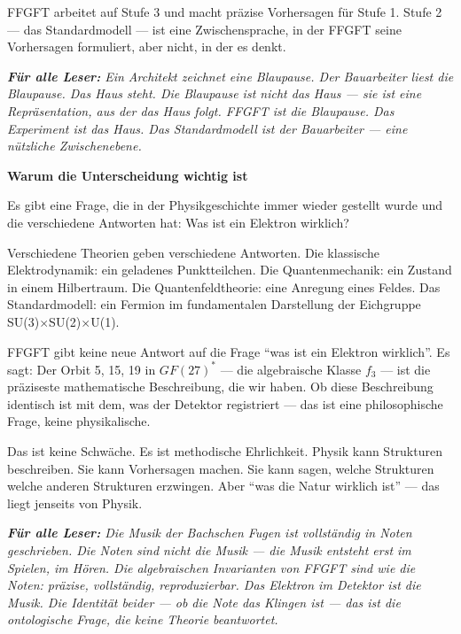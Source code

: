 \documentclass[11pt,oneside]{book}
\newenvironment{laierspur}{%
  \par\vspace{4pt}%
  \noindent\small\itshape\color{blue!60!black}%
  \textbf{Für alle Leser:}\enspace\ignorespaces}{%
  \par\vspace{4pt}\normalsize\normalfont\normalcolor}
\begin{document}
FFGFT arbeitet auf Stufe 3 und macht präzise Vorhersagen für Stufe 1.
Stufe 2 — das Standardmodell — ist eine Zwischensprache, in der FFGFT
seine Vorhersagen formuliert, aber nicht, in der es denkt.


\begin{laierspur}
Ein Architekt zeichnet eine Blaupause. Der Bauarbeiter
liest die Blaupause. Das Haus steht. Die Blaupause ist nicht das Haus —
sie ist eine Repräsentation, aus der das Haus folgt. FFGFT ist die
Blaupause. Das Experiment ist das Haus. Das Standardmodell ist der
Bauarbeiter — eine nützliche Zwischenebene.
\end{laierspur}

\textbf{Warum die Unterscheidung wichtig ist}


Es gibt eine Frage, die in der Physikgeschichte immer wieder gestellt
wurde und die verschiedene Antworten hat: Was ist ein Elektron wirklich?


Verschiedene Theorien geben verschiedene Antworten. Die klassische
Elektrodynamik: ein geladenes Punktteilchen. Die Quantenmechanik:
ein Zustand in einem Hilbertraum. Die Quantenfeldtheorie: eine Anregung
eines Feldes. Das Standardmodell: ein Fermion im fundamentalen
Darstellung der Eichgruppe SU(3)$\times$SU(2)$\times$U(1).


FFGFT gibt keine neue Antwort auf die Frage \enquote{was ist ein Elektron wirklich}.
Es sagt: Der Orbit {5, 15, 19} in $GF(27)^*$ — die algebraische Klasse $f_3$ —
ist die präziseste mathematische Beschreibung, die wir haben. Ob diese
Beschreibung identisch ist mit dem, was der Detektor registriert — das
ist eine philosophische Frage, keine physikalische.


Das ist keine Schwäche. Es ist methodische Ehrlichkeit. Physik kann
Strukturen beschreiben. Sie kann Vorhersagen machen. Sie kann sagen,
welche Strukturen welche anderen Strukturen erzwingen. Aber \enquote{was die
Natur wirklich ist} — das liegt jenseits von Physik.


\begin{laierspur}
Die Musik der Bachschen Fugen ist vollständig in Noten
geschrieben. Die Noten sind nicht die Musik — die Musik entsteht
erst im Spielen, im Hören. Die algebraischen Invarianten von FFGFT
sind wie die Noten: präzise, vollständig, reproduzierbar. Das
Elektron im Detektor ist die Musik. Die Identität beider — ob die
Note das Klingen ist — das ist die ontologische Frage, die keine
Theorie beantwortet.
\end{laierspur}
\end{document}
